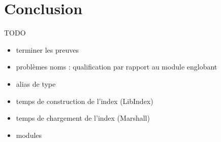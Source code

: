 \documentclass[a4paper]{report}
\theoremstyle{definition}
\begin{document}
\chapter{Conclusion}

TODO
\begin{itemize}
	\item terminer les preuves
	\item problèmes noms : qualification par rapport au module englobant
	\item alias de type
	\item temps de construction de l'index (LibIndex)
	\item temps de chargement de l'index (Marshall)
	\item modules
\end{itemize}


\printbibliography
\end{document}
